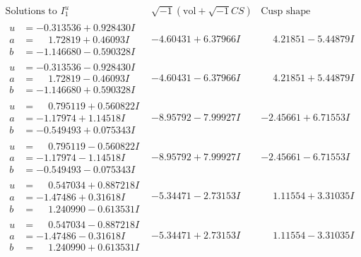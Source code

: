 \documentclass[1p]{elsarticle_modified}
\theoremstyle{definition}
\newcommand{\I}{\sqrt{-1}}
\begin{document}
$$\begin{array}{c|c|c}  
\text{Solutions to }I^u_{1}& \I (\text{vol} + \sqrt{-1}CS) & \text{Cusp shape}\\
 \hline 
\begin{aligned}
u &= -0.313536 + 0.928430 I \\
a &= \phantom{-}1.72819 + 0.46093 I \\
b &= -1.146680 - 0.590328 I\end{aligned}
 & -4.60431 + 6.37966 I & \phantom{-}4.21851 - 5.44879 I \\ \hline\begin{aligned}
u &= -0.313536 - 0.928430 I \\
a &= \phantom{-}1.72819 - 0.46093 I \\
b &= -1.146680 + 0.590328 I\end{aligned}
 & -4.60431 - 6.37966 I & \phantom{-}4.21851 + 5.44879 I \\ \hline\begin{aligned}
u &= \phantom{-}0.795119 + 0.560822 I \\
a &= -1.17974 + 1.14518 I \\
b &= -0.549493 + 0.075343 I\end{aligned}
 & -8.95792 - 7.99927 I & -2.45661 + 6.71553 I \\ \hline\begin{aligned}
u &= \phantom{-}0.795119 - 0.560822 I \\
a &= -1.17974 - 1.14518 I \\
b &= -0.549493 - 0.075343 I\end{aligned}
 & -8.95792 + 7.99927 I & -2.45661 - 6.71553 I \\ \hline\begin{aligned}
u &= \phantom{-}0.547034 + 0.887218 I \\
a &= -1.47486 + 0.31618 I \\
b &= \phantom{-}1.240990 - 0.613531 I\end{aligned}
 & -5.34471 - 2.73153 I & \phantom{-}1.11554 + 3.31035 I \\ \hline\begin{aligned}
u &= \phantom{-}0.547034 - 0.887218 I \\
a &= -1.47486 - 0.31618 I \\
b &= \phantom{-}1.240990 + 0.613531 I\end{aligned}
 & -5.34471 + 2.73153 I & \phantom{-}1.11554 - 3.31035 I \\ \hline\begin{aligned}

\end{aligned}
\end{array}$$
\end{document}
